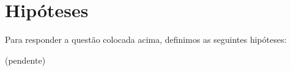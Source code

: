 \section{Hipóteses} \label{hipoteses}

Para responder a questão colocada acima, definimos as seguintes hipóteses:

(pendente)

%
%
%    
%
%
%


%
%


